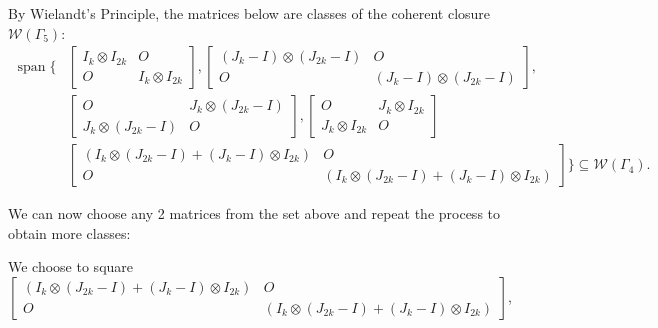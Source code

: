 By Wielandt's Principle, the matrices below are classes of the coherent closure $\mathcal{W}(\Gamma_5)$:
\begin{align*}
    \operatorname{span}\{
    &\begin{bmatrix}
        I_k\otimes I_{2k} & O\\
        O & I_k\otimes I_{2k}
    \end{bmatrix}, 
    \begin{bmatrix}
        (J_k-I)\otimes(J_{2k}-I) & O\\
        O & (J_k-I)\otimes(J_{2k}-I)
    \end{bmatrix},\\
    &\begin{bmatrix}
        O & J_k\otimes (J_{2k}-I)\\
        J_k\otimes (J_{2k}-I) & O
    \end{bmatrix},
    \begin{bmatrix}
        O & J_k\otimes I_{2k}\\
        J_k\otimes I_{2k} & O
    \end{bmatrix}\\
    &\begin{bmatrix}
        (I_k\otimes(J_{2k}-I) + (J_k-I)\otimes I_{2k}) & O\\
        O & (I_k\otimes(J_{2k}-I) + (J_k-I)\otimes I_{2k})
    \end{bmatrix}
    \}\subseteq\mathcal{W}(\Gamma_4).
\end{align*}

We can now choose any 2 matrices from the set above and repeat the process to obtain more classes:

We choose to square $\begin{bmatrix}
        (I_k\otimes(J_{2k}-I) + (J_k-I)\otimes I_{2k}) & O\\
        O & (I_k\otimes(J_{2k}-I) + (J_k-I)\otimes I_{2k})
    \end{bmatrix}$,

